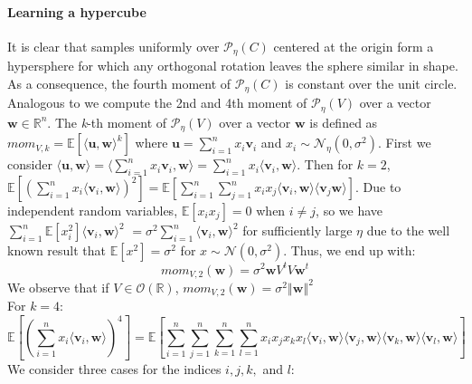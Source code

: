 \documentclass[12 pt]{article}        	%
\newcommand{\PP}[2][]{\mathcal{P}_{#1}(\mat{#2})}
\newcommand{\mat}[1]{\mathit{#1}}
\renewcommand{\vec}[1]{\mathbf{#1}}
\newcommand{\bb}[1]{\mathbb{#1}}
\begin{document}
\paragraph{Learning a hypercube}
It is clear that samples uniformly over $\PP[\eta]{C}$ centered at the origin form a hypersphere for which any orthogonal rotation leaves the sphere similar in shape.
As a consequence, the fourth moment of $\PP[\eta]{C}$ is constant over the unit circle. \\ 
Analogous to \cite{NR09} we compute the 2nd and 4th moment of $\PP[\eta]{V}$ over a vector $\vec{w} \in \bb{R}^n$.
The \textit{k}-th moment of $\PP[\eta]{V}$ over a vector $\vec{w}$ is defined as $mom_{\mat{V}, k} = \bb{E}[\langle \vec{u}, \vec{w} \rangle ^k]$ where $\vec{u} = \sum_{i=1}^{n} x_i \vec{v}_i$ and $x_i \sim \mathcal{N}_{\eta}(0, \sigma^2)$.
First we consider $\langle \vec{u}, \vec{w} \rangle = \langle \sum_{i=1}^{n} x_i\vec{v}_i, \vec{w}\rangle = \sum_{i=1}^{n}x_i \langle\vec{v}_i, \vec{w} \rangle$.
Then for $k=2$, $\bb{E}[(\sum_{i=1}^{n}x_i \langle\vec{v}_i, \vec{w} \rangle)^2] = \bb{E}[\sum_{i=1}^{n} \sum_{j=1}^{n} x_i x_j \langle \vec{v}_i, \vec{w} \rangle \langle \vec{v}_j \vec{w} \rangle]$.
Due to independent random variables, $\bb{E}[x_i x_j] = 0$ when $i \neq j$, so we have $ \sum_{i=1}^{n}\bb{E}[x_i^2]\langle \vec{v}_i, \vec{w} \rangle^2$ 
$= \sigma^2 \sum_{i=1}^{n}\langle \vec{v}_i, \vec{w} \rangle^2$ for sufficiently large $\eta$ due to the well known result that $\bb{E}[x^2] = \sigma^2$ for $x \sim \mathcal{N}(0, \sigma^2)$.
Thus, we end up with:
\begin{equation}
mom_{\mat{V}, 2}(\vec{w}) = \sigma^2 \vec{w}\mat{V}^t\mat{V}\vec{w}^t
\end{equation}
We observe that if $\mat{V} \in \mathcal{O}(\bb{R})$, $mom_{\mat{V}, 2}(\vec{w}) = \sigma^2 \left \Vert \vec{w} \right \Vert^2$ \\
For $k=4$:
\[
    \bb{E}[(\sum_{i=1}^{n} x_i \langle \vec{v}_i, \vec{w} \rangle)^4] = \bb{E}[\sum_{i=1}^{n}\sum_{j=1}^{n}\sum_{k=1}^{n}\sum_{l=1}^{n}x_i x_j x_k x_l \langle \vec{v}_i, \vec{w} \rangle \langle \vec{v}_j, \vec{w} \rangle \langle \vec{v}_k, \vec{w} \rangle \langle \vec{v}_l, \vec{w} \rangle]
\]
We consider three cases for the indices $i, j, k,$ and $l$:
\end{document}
